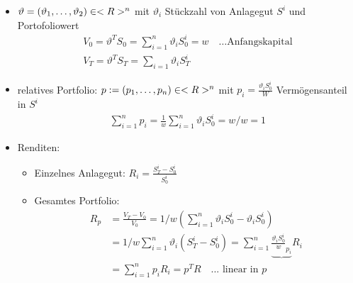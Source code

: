 \begin{*remark}
	\begin{itemize}
		\item $\vartheta = (\vartheta_1, \dots, \vartheta_2) \in <R>^n$ mit $\vartheta_i$ Stückzahl von Anlagegut $S^i$ und Portofoliowert
		\begin{align*}
			V_0 = \vartheta^T S_0 = \sum_{i=1}^n \vartheta_i S_0^i = w \quad \dots \text{Anfangskapital}\\
			V_T = \vartheta^T S_T = \sum_{i=1}\vartheta_i S_T^i
		\end{align*}
		\item relatives Portfolio: $p := (p_1, \dots, p_n) \in <R>^n$ mit $p_i = \frac{\vartheta_i S_0^i}{W}$ Vermögensanteil in $S^i$
		\begin{align*}
			\sum_{i=1}^n p_i = \frac{1}{w}\sum_{i=1}^n \vartheta_i S_0^i = w/w = 1
		\end{align*}
		\item Renditen: 
		\begin{itemize}
			\item Einzelnes Anlagegut: $R_i = \frac{S_T^i - S_0^i}{S_0^i}$
			\item Gesamtes Portfolio: 
			\begin{align*}
				R_p &= \frac{V_T - V_0}{V_0} = 1/w (\sum_{i=1}^n \vartheta_i S_0^i - \vartheta_i S_0^i)\\
				&= 1/w \sum_{i=1}^n \vartheta_i(S_T^i - S_0^i) = \sum_{i=1}^n \underbrace{\frac{\vartheta_i S_0^i}{w}_{p_i}}R_i\\
				&= \sum_{i=1}^n p_i R_i = p^T R \quad \text{... linear in }p
			\end{align*}
		\end{itemize}
	\end{itemize}
\end{*remark}